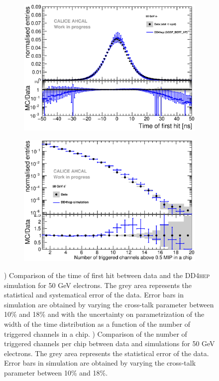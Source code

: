 \documentclass{JINST}
\newcommand\ddhep{\textsc{DD4hep}\xspace}
\begin{document}
\begin{figure}[htbp!]
  \centering
  \begin{subfigure}[t]{0.49\textwidth}
    \includegraphics[width=1\textwidth]{fig/Comparison_SimData_Electrons50GeV_DD4heponly.eps}
    \caption{}\label{fig:elec_sim_data_50GeV}
  \end{subfigure}
  \hfill
  \begin{subfigure}[t]{0.49\textwidth}
    \includegraphics[width=1\textwidth]{fig/Comparison_SimData_Electrons_nHits_50GeV_DD4heponly.eps}
    \caption{}\label{fig:elec_sim_data_nHits_50GeV}
  \end{subfigure}
  \caption{) Comparison of the time of first hit between data and the \ddhep simulation for 50 GeV electrons. The grey area represents the statistical and systematical error of the data. Error bars in simulation are obtained by varying the cross-talk parameter between 10\% and 18\% and with the uncertainty on parametrization of the width of the time distribution as a function of the number of triggered channels in a chip. ) Comparison of the number of triggered channels per chip between data and simulations for 50 GeV electrons. The grey area represents the statistical error of the data. Error bars in simulation are obtained by varying the cross-talk parameter between 10\% and 18\%.}
\end{figure}
\end{document}
